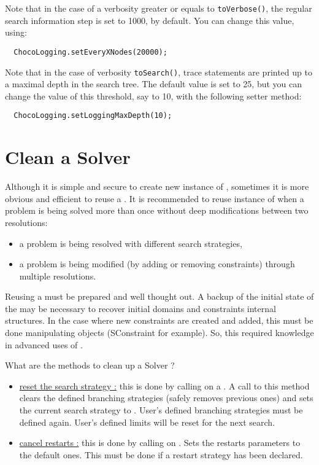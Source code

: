 Note that in the case of a verbosity greater or equals to \texttt{toVerbose()}, the regular search information step is set to 1000, by default. You can change this value, using:
\begin{lstlisting}
  ChocoLogging.setEveryXNodes(20000);
\end{lstlisting}
 

Note that in the case of verbosity \texttt{toSearch()}, trace statements are printed up to a maximal depth in the search tree. The default value is set to 25, but you can change the value of this threshold, say to 10, with the following setter method:
\begin{lstlisting}
  ChocoLogging.setLoggingMaxDepth(10);
\end{lstlisting}


\section{Clean a Solver}\label{solver:clean}\hypertarget{solver:clean}{}

Although it is simple and secure to create new instance of , sometimes it  is more obvious and efficient to reuse a . 
It is recommended to reuse instance of  when a problem is being solved more than once without deep modifications between two resolutions:
\begin{itemize}
\item a problem is being resolved with different search strategies,
\item a problem is being modified (by adding or removing constraints) through multiple resolutions.
\end{itemize}

\begin{note}
Reusing a  must be prepared and well thought out. A backup of the initial state of the  may be necessary to recover initial domains and constraints internal structures. In the case where new constraints are created and added, this must be done manipulating  objects (SConstraint for example). So, this required knowledge in advanced uses of .
\end{note}

What are the methods to clean up a Solver ?
\begin{itemize}
\item \underline{reset the search strategy :} this is done by calling  on a .
A call to this method clears the defined branching strategies (safely removes previous ones) and sets the current search strategy to .
User's defined branching strategies must be defined again.
User's defined limits will be reset for the next search.

\item \underline{cancel restarts :} this is done by calling  on .
Sets the restarts parameters to the default ones. This must be done if a restart strategy has been declared.

\end{itemize}

